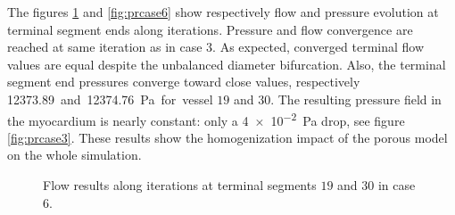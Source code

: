 \documentclass[a4paper, 11pt]{article} %
\begin{document}
The figures \ref{fig:flcase6} and \ref{fig:prcase6}\protect{} show respectively flow and pressure evolution at terminal segment ends along iterations.  
Pressure and flow convergence are reached at same iteration as in case $3$. As expected, converged terminal flow values are equal despite the unbalanced diameter bifurcation. Also, the terminal segment end pressures converge toward close values, respectively \SI{12373.89} and \SI{12374.76}{\Pa} for vessel $19$ and $30$. The resulting pressure field in the myocardium is nearly constant: only a \SI{4e-2}{\Pa} drop, see figure \ref{fig:prcase3}\protect{}. These results show the homogenization impact of the porous model on the whole simulation. 


\begin{figure}[hbtp]
\begin{adjustwidth}{-2cm}{}
\begin{center}
\hspace{0.1cm}
\caption{Flow results along iterations at terminal segments $19$ and $30$ in case 6.}
\label{fig:flcase6}
\end{center}
\end{adjustwidth}
\end{figure}
\end{document}
